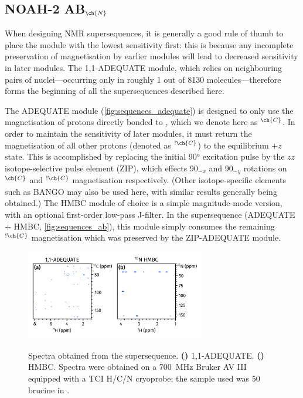 \documentclass[a4paper,12pt]{article}
\newcommand{\carbon}{\ch{^{13}C}}
\newcommand{\nitrogen}{\ch{^{15}N}}
\newcommand{\magn}[1]{\ch{^1H}$^{#1}$}
\newcommand{\magnnot}[1]{\ch{^1H}$^{!#1}$}
\newcommand*{\brucine}{Spectra were obtained on a \SI{700}{\MHz} Bruker AV III equipped with a TCI H/C/N cryoprobe; the sample used was \SI{50}{\milli\molar} brucine in \ch{CDCl3}.}
\newcommand{\angang}[2]{#1\rlap{\unit{\degree}}\ensuremath{_{#2}}}
\begin{document}
\begin{refsection}
\section{NOAH-2 AB\texorpdfstring{$_{\ch{N}}$}{n}}

When designing NMR supersequences, it is generally a good rule of thumb to place the module with the lowest sensitivity first: this is because any incomplete preservation of magnetisation by earlier modules will lead to decreased sensitivity in later modules.
The 1,1-ADEQUATE module, which relies on neighbouring pairs of \carbon{} nuclei---occurring only in roughly 1 out of 8130 molecules---therefore forms the beginning of all the supersequences described here.

The ADEQUATE module (\cref{fig:sequences_adequate}) is designed to only use the magnetisation of protons directly bonded to \carbon{}, which we denote here as \magn{\ch{C}}.\autocite{Orts2018M,Yong2021JMR}
In order to maintain the sensitivity of later modules, it must return the magnetisation of all other protons (denoted as \magnnot{\ch{C}}) to the equilibrium $+z$ state.
This is accomplished by replacing the initial \ang{90} excitation pulse by the $zz$ isotope-selective pulse element (ZIP)\autocite{Hansen2021AC,Yong2021JMR}, which effects \angang{90}{-x} and \angang{90}{-y} rotations on \magn{\ch{C}} and \magnnot{\ch{C}} magnetisation respectively.
(Other isotope-specific elements such as BANGO\autocite{Sorensen1994BMR,Nagy2019CC,Nagy2021ACIE} may also be used here, with similar results generally being obtained.\autocite{Yong2021JMR})
The \nitrogen{} HMBC module of choice is a simple magnitude-mode version, with an optional first-order low-pass J-filter.
In the  supersequence (ADEQUATE + \nitrogen{} HMBC, \cref{fig:sequences_ab}), this module simply consumes the remaining \magnnot{\ch{C}} magnetisation which was preserved by the ZIP-ADEQUATE module.

\begin{figure}[ht]
    \centering
    \includegraphics[width=0.7\textwidth]{ab.png}
    {\label{fig:ab_adeq}}
    {\label{fig:ab_n_hmbc}}
    \caption{
        Spectra obtained from the  supersequence.
        \textbf{()} 1,1-ADEQUATE.
        \textbf{()} \nitrogen{} HMBC.
        \brucine{}
    }
    \label{fig:ab}
\end{figure}



\end{refsection}
\end{document}

